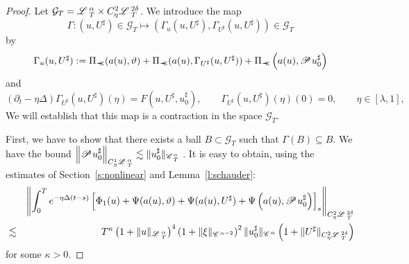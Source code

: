 \documentclass[11pt,reqno]{amsart}
\newcommand{\assign}{:=}
\newcommand{\precprec}{\prec\!\!\!\prec}
\newcommand{\CC}{\mathscr{C} \hspace{.1em}}
\newcommand{\LL}{\mathscr{L} \hspace{.2em}}
\newcommand{\PP}{\mathscr{P} \hspace{.1em}}
\begin{document}
\begin{proof}
  Let $\mathcal{G}_T = \LL^{\alpha}_T \times C_{\eta}^2 \LL^{2 \delta}_T$. We
  introduce the map
  \[ \Gamma : (u, U^{\sharp}) \in \mathcal{G}_T \mapsto (\Gamma_u (u,
     U^{\sharp}), \Gamma_{U^{\sharp}} (u, U^{\sharp})) \in \mathcal{G}_T \]
  by
  \[ \Gamma_u (u, U^{\sharp}) \assign \Pi_{\precprec} (a (u), \vartheta) +
     \Pi_{\precprec} (a (u), \Gamma_{U^{\sharp}} (u, U^{\sharp})) +
     \Pi_{\precprec} \left( a (u), \PP u_0^{\sharp} \right) \]
  and
  \[ (\partial_t - \eta \Delta) \Gamma_{U^{\sharp}} (u, U^{\sharp}) (\eta) = F
     (u, U^{\sharp}, u_0^{\sharp}), \qquad \Gamma_{U^{\sharp}} (u, U^{\sharp})
     (\eta) (0) = 0, \qquad \eta \in [\lambda, 1], \]
  We will establish that this map is a contraction in the space $\mathcal{G}_T
  .$
  
  First, we have to show that there exists a ball $B \subset \mathcal{G}_T$
  such that $\Gamma (B) \subseteq B$. We have the bound $\left\| \PP
  u_0^{\sharp} \right\|_{C^1_{\eta} \LL^{\alpha}_T} \lesssim \| u^{\sharp}_0
  \|_{\CC^{\alpha}_T}$ . It is easy to obtain, using the estimates of
  Section~\ref{s:nonlinear} and Lemma~\ref{l:schauder}:
  \begin{eqnarray*}
    &  & \left\| \int_0^T e^{- \eta \Delta (t - s)} \left[ \Phi_1 (u) + \Psi
    (a (u), \vartheta) + \Psi (a (u), U^{\sharp}) + \Psi \left( a (u), \PP
    u_0^{\sharp} \right) \right]_s \right\|_{C^2_{\eta} \LL_T^{2 \delta}}\\
    & \lesssim & T^{\kappa} \left( 1 + \| u \|_{\LL^{\alpha}_T} \right)^4
    \left( 1 + \| \xi \|_{\CC^{\alpha - 2}} \right)^2 \| u_0^{\sharp}
    \|_{\CC^{\alpha}} \left( 1 + \| U^{\sharp} \|_{C^2_{\eta} \LL^{2
    \delta}_T} \right)
  \end{eqnarray*}
  for some $\kappa > 0$.
  

\end{proof}
\end{document}

